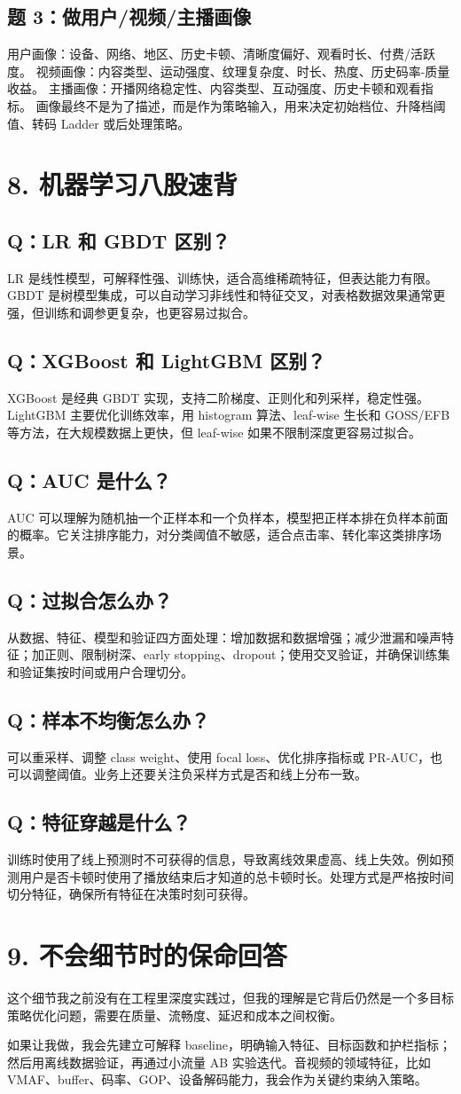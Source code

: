 ﻿\documentclass[11pt,a4paper]{ctexart}
\newcommand{\qa}[2]{\subsection*{Q：#1}\begin{answerbox}#2\end{answerbox}}
\newcommand{\keybox}[1]{\begin{answerbox}#1\end{answerbox}}
\begin{document}
\subsection*{题 3：做用户/视频/主播画像}
\keybox{用户画像：设备、网络、地区、历史卡顿、清晰度偏好、观看时长、付费/活跃度。\newline
视频画像：内容类型、运动强度、纹理复杂度、时长、热度、历史码率-质量收益。\newline
主播画像：开播网络稳定性、内容类型、互动强度、历史卡顿和观看指标。\newline
画像最终不是为了描述，而是作为策略输入，用来决定初始档位、升降档阈值、转码 Ladder 或后处理策略。}

\newpage
\section{8. 机器学习八股速背}

\qa{LR 和 GBDT 区别？}{LR 是线性模型，可解释性强、训练快，适合高维稀疏特征，但表达能力有限。GBDT 是树模型集成，可以自动学习非线性和特征交叉，对表格数据效果通常更强，但训练和调参更复杂，也更容易过拟合。}

\qa{XGBoost 和 LightGBM 区别？}{XGBoost 是经典 GBDT 实现，支持二阶梯度、正则化和列采样，稳定性强。LightGBM 主要优化训练效率，用 histogram 算法、leaf-wise 生长和 GOSS/EFB 等方法，在大规模数据上更快，但 leaf-wise 如果不限制深度更容易过拟合。}

\qa{AUC 是什么？}{AUC 可以理解为随机抽一个正样本和一个负样本，模型把正样本排在负样本前面的概率。它关注排序能力，对分类阈值不敏感，适合点击率、转化率这类排序场景。}

\qa{过拟合怎么办？}{从数据、特征、模型和验证四方面处理：增加数据和数据增强；减少泄漏和噪声特征；加正则、限制树深、early stopping、dropout；使用交叉验证，并确保训练集和验证集按时间或用户合理切分。}

\qa{样本不均衡怎么办？}{可以重采样、调整 class weight、使用 focal loss、优化排序指标或 PR-AUC，也可以调整阈值。业务上还要关注负采样方式是否和线上分布一致。}

\qa{特征穿越是什么？}{训练时使用了线上预测时不可获得的信息，导致离线效果虚高、线上失效。例如预测用户是否卡顿时使用了播放结束后才知道的总卡顿时长。处理方式是严格按时间切分特征，确保所有特征在决策时刻可获得。}

\section{9. 不会细节时的保命回答}
\keybox{这个细节我之前没有在工程里深度实践过，但我的理解是它背后仍然是一个多目标策略优化问题，需要在质量、流畅度、延迟和成本之间权衡。

如果让我做，我会先建立可解释 baseline，明确输入特征、目标函数和护栏指标；然后用离线数据验证，再通过小流量 AB 实验迭代。音视频的领域特征，比如 VMAF、buffer、码率、GOP、设备解码能力，我会作为关键约束纳入策略。}
\end{document}
